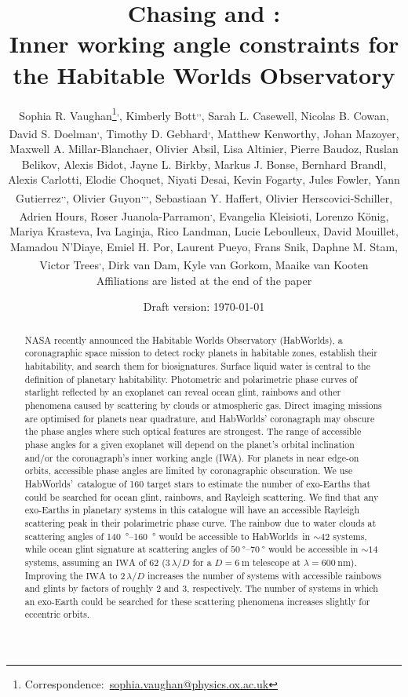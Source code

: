 \documentclass[usenatbib]{mnras}
\title{Chasing \rainbows and \oceanglint:\\ Inner working angle constraints for the Habitable Worlds Observatory}
\author[Sophia R. Vaughan et al.]{%
    Sophia R. Vaughan\thanks{Correspondence:~\url{sophia.vaughan@physics.ox.ac.uk}}\textsuperscript{,\afflink{1}},
    Kimberly Bott\textsuperscript{\afflink{2},\afflink{3},\afflink{4}},
    Sarah L. Casewell\textsuperscript{\afflink{5}},
    Nicolas B. Cowan\textsuperscript{\afflink{6}},
    David S. Doelman\textsuperscript{\afflink{7},\afflink{8}},
    \newauthor
    Timothy D. Gebhard\textsuperscript{\afflink{9},\afflink{10}},
    Matthew Kenworthy\textsuperscript{\afflink{7}},
    Johan Mazoyer\textsuperscript{\afflink{11}},
    Maxwell A. Millar-Blanchaer\textsuperscript{\afflink{12}},
    \newauthor
    Olivier Absil\textsuperscript{\afflink{13}},
    Lisa Altinier\textsuperscript{\afflink{14}},
    Pierre Baudoz\textsuperscript{\afflink{11}},
    Ruslan Belikov\textsuperscript{\afflink{15}},
    Alexis Bidot\textsuperscript{\afflink{16}},
    Jayne L. Birkby\textsuperscript{\afflink{1}},
    \newauthor
    Markus J. Bonse\textsuperscript{\afflink{10}},
    Bernhard Brandl\textsuperscript{\afflink{7}},
    Alexis Carlotti\textsuperscript{\afflink{16}},
    Elodie Choquet\textsuperscript{\afflink{14}},
    Niyati Desai\textsuperscript{\afflink{17}},
    \newauthor
    Kevin Fogarty\textsuperscript{\afflink{15}},
    Jules Fowler\textsuperscript{\afflink{18}},
    Yann Gutierrez\textsuperscript{\afflink{11},\afflink{19},\afflink{20}},
    Olivier Guyon\textsuperscript{\afflink{21},\afflink{22},\afflink{23},\afflink{24}},
    Sebastiaan Y. Haffert\textsuperscript{\afflink{21}},
    \newauthor
    Olivier Herscovici-Schiller\textsuperscript{\afflink{19}},
    Adrien Hours\textsuperscript{\afflink{16}},
    Roser Juanola-Parramon\textsuperscript{\afflink{25},\afflink{26}},
    Evangelia Kleisioti\textsuperscript{\afflink{7}},
    \newauthor
    Lorenzo König\textsuperscript{\afflink{13}},
    Mariya Krasteva\textsuperscript{\afflink{27}},
    Iva Laginja\textsuperscript{\afflink{11}},
    Rico Landman\textsuperscript{\afflink{7}},
    Lucie Leboulleux\textsuperscript{\afflink{16}},
    \newauthor
    David Mouillet\textsuperscript{\afflink{16}},
    Mamadou N’Diaye\textsuperscript{\afflink{28}},
    Emiel H. Por\textsuperscript{\afflink{29}},
    Laurent Pueyo\textsuperscript{\afflink{29}},
    Frans Snik\textsuperscript{\afflink{7}},
    \newauthor
    Daphne M. Stam\textsuperscript{\afflink{30}},
    Victor Trees\textsuperscript{\afflink{31},\afflink{32}},
    Dirk van Dam\textsuperscript{\afflink{7}},
    Kyle van Gorkom\textsuperscript{\afflink{21}},
    Maaike van Kooten\textsuperscript{\afflink{33}}
    \newauthor \\%
    Affiliations are listed at the end of the paper
}
\date{Draft version: \today}
\newcommand{\IWA}{\ensuremath{\mathrm{IWA}}\xspace}
\newcommand{\HWO}{HabWorlds\xspace}
\begin{document}
 

\maketitle

\begin{abstract}
NASA recently announced the Habitable Worlds Observatory (\HWO), a coronagraphic space mission to detect rocky planets in habitable zones, establish their habitability, and search them for biosignatures. 
Surface liquid water is central to the definition of planetary habitability.
%
Photometric and polarimetric phase curves of starlight reflected by an exoplanet can reveal ocean glint, rainbows and other phenomena caused by scattering by clouds or atmospheric gas.
%
Direct imaging missions are optimised for planets near quadrature, and \HWO' coronagraph may obscure the phase angles where such optical features are strongest. 
%
The range of accessible phase angles for a given exoplanet will depend on the planet's orbital inclination and/or the coronagraph's inner working angle (IWA). 
%
For planets in near edge-on orbits, accessible phase angles are limited by coronagraphic obscuration. 
%
We use \HWO'~catalogue of 160 target stars to estimate the number of exo-Earths that could be searched for ocean glint, rainbows, and Rayleigh scattering. 
%
We find that any exo-Earths in planetary systems in this catalogue will have an accessible Rayleigh scattering peak in their polarimetric phase curve. 
%
The rainbow due to water clouds at scattering angles of \qtyrange{140}{160}{\degree} would be accessible to \HWO\ in $\sim\num{42}$ systems, while ocean glint signature at scattering angles of $\qtyrange{50}{70}{\degree}$ would be accessible in $\sim\num{14}$ systems, assuming an \IWA of \qty{62}{\mas} ($3\,\lambda/D$ for a $D=\qty{6}{\meter}$ telescope at $\lambda=\qty{600}{\nano\meter}$).
%
Improving the \IWA to $2\,\lambda/D$ increases the number of systems with accessible rainbows and glints by factors of roughly 2 and 3, respectively.
%
The number of systems in which an exo-Earth could be searched for these scattering phenomena increases slightly for eccentric orbits.  %
\end{abstract}
\end{document}
